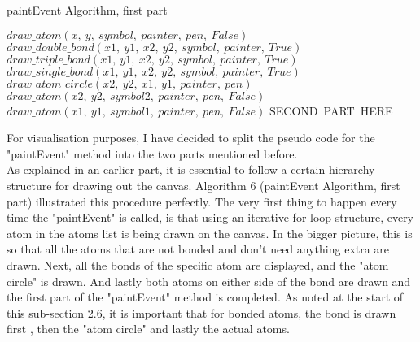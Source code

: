 \documentclass[a4paper,12pt]{article}
\begin{document}
\begin{algorithm}
\footnotesize
\caption{paintEvent Algorithm, first part}\label{alg:cap}
\begin{algorithmic}
	\State $ draw\_atom(x,\ y,\ symbol,\ painter,\ pen,\ False)$
			\State $ draw\_double\_bond(x1,\ y1,\ x2,\ y2,\ symbol,\ painter,\ True)$
			\State $ draw\_triple\_bond(x1,\ y1,\ x2,\ y2,\ symbol,\ painter,\ True)$
		\Else
			\State $ draw\_single\_bond(x1,\ y1,\ x2,\ y2,\ symbol,\ painter,\ True)$
		\EndIf
		\State $ draw\_atom\_circle(x2,\ y2,\ x1,\ y1,\ painter,\ pen)$
		\State $ draw\_atom(x2,\ y2,\ symbol2,\ painter,\ pen,\ False)$
		\State $ draw\_atom(x1,\ y1,\ symbol1,\ painter,\ pen,\ False)$
	\EndFor
\EndFor
\State SECOND\ PART\ HERE
\EndFunction
\end{algorithmic}
\end{algorithm}

For visualisation purposes, I have decided to split the pseudo code for the "paintEvent" method into the two parts mentioned before.\\
As explained in an earlier part, it is essential to follow a certain hierarchy structure for drawing out the canvas. Algorithm 6 (paintEvent Algorithm, first part) illustrated this procedure perfectly. The very first thing to happen every time the "paintEvent" is called, is that using an iterative for-loop structure, every atom in the atoms list is being drawn on the canvas. In the bigger picture, this is so that all the atoms that are not bonded and don't need anything extra are drawn. Next, all the bonds of the specific atom are displayed, and the "atom circle" is drawn. And lastly both atoms on either side of the bond are drawn and the first part of the "paintEvent" method is completed. As noted at the start of this sub-section 2.6, it is important that for bonded atoms, the bond is drawn first , then the "atom circle" and lastly the actual atoms.

\newpage
\end{document}
